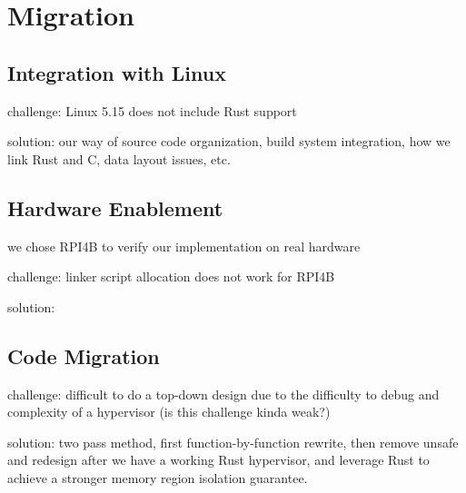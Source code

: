 \chapter{\rustsec{} Migration}
\label{sec:migration}

\section{Integration with Linux}

challenge: Linux 5.15 does not include Rust support

solution: our way of source code organization, build system integration,
how we link Rust and C, data layout issues, etc.

\section{Hardware Enablement}

we chose RPI4B to verify our implementation on real hardware

challenge: linker script allocation does not work for RPI4B

solution: 

\section{Code Migration}

challenge: difficult to do a top-down design due to the difficulty to debug
and complexity of a hypervisor (is this challenge kinda weak?)

solution: two pass method, first function-by-function rewrite, then remove
unsafe and redesign after we have a working Rust hypervisor, and leverage
Rust to achieve a stronger memory region isolation guarantee.

